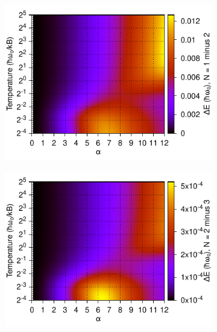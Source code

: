 \begin{figure}[!tbp]
\begin{subfigure}[b]{0.49\textwidth}
    \includegraphics[width=\textwidth]{figures/frohlich-3d-energy-alpha-0to12-temp-00625to32-N-1minus2-contourf-COLOUR.pdf}
  \end{subfigure}
  \begin{subfigure}[b]{0.49\textwidth}
    \centering
    \includegraphics[width=\textwidth]{figures/frohlich-3d-energy-alpha-0to12-temp-00625to32-N-2minus3-contourf-COLOUR.pdf}
  \end{subfigure}

\end{figure}
